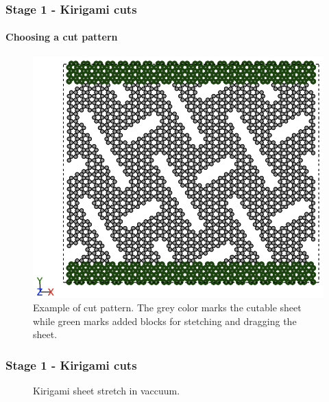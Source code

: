 \documentclass[
	10pt, %
]{beamer}
\begin{document}
\begin{frame}
	\frametitle{Stage 1 - Kirigami cuts}
	\framesubtitle{Choosing a cut pattern}


	\begin{figure}
		\includegraphics[width=0.6\linewidth]{figures/cutpattern.png}
		\caption{Example of cut pattern. The grey color marks the cutable sheet while green marks added blocks for stetching and dragging the sheet.}
	\end{figure}	

\end{frame}




\begin{frame}
	\frametitle{Stage 1 - Kirigami cuts}


	\begin{figure}
		\centering    
		\caption{Kirigami sheet stretch in vaccuum.}
   \end{figure} 

\end{frame}
\end{document}
